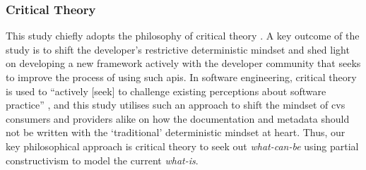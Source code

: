 \subsubsection*{Critical Theory}
This study chiefly adopts the philosophy of critical theory \citep{Calhoun:1995ww}. A key outcome of the study is to shift the developer's restrictive deterministic mindset and shed light on developing a new framework actively with the developer community that seeks to improve the process of using such \glspl{api}. In software engineering, critical theory is used to ``actively [seek] to challenge existing perceptions about software practice'' \citep{Easterbrook:2007ws}, and this study utilises such an approach to shift the mindset of \gls{cvs} consumers and providers alike on how the documentation and metadata should not be written with the `traditional' deterministic mindset at heart. Thus, our key philosophical approach is critical theory to seek out \textit{what-can-be} using  partial constructivism to model the current \textit{what-is}.
